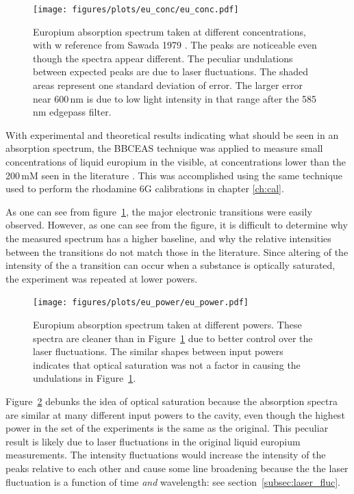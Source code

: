 \begin{figure}[t]
\begin{center}
\texttt{[image: figures/plots/eu\_conc/eu\_conc.pdf]}
\end{center}
\caption[Europium Absorption Spectra at different Concentrations]{Europium absorption spectrum taken at different concentrations, with w reference from Sawada 1979 \cite{Sawada:1979vca}. The peaks are noticeable even though the spectra appear different. The peculiar undulations between expected peaks are due to laser fluctuations. The shaded areas represent one standard deviation of error. The larger error near 600\,nm is due to low light intensity in that range after the 585\,nm edgepass filter.}
\label{fig:eu_conc}
\end{figure}

With experimental and theoretical results indicating what should be seen in
an absorption spectrum, the \ac{BBCEAS} technique was applied to measure
small concentrations of liquid europium in the visible, at concentrations
lower than the 200\,mM seen in the literature \cite{Sawada:1979vca}. This
was accomplished using the same technique used to perform the rhodamine 6G
calibrations in chapter \ref{ch:cal}.

As one can see from figure~\ref{fig:eu_conc}, the major electronic transitions
were easily observed. However, as one can see from the figure, it is difficult
to determine why the measured spectrum has a higher baseline, and why the
relative intensities between the transitions do not match those in the
literature. Since altering of the intensity of the a transition can occur
when a substance is optically saturated, the experiment was repeated at lower
powers.

\begin{figure}[t]
\begin{center}
  \texttt{[image: figures/plots/eu\_power/eu\_power.pdf]}
\end{center}
\caption[Europium Absorption Spectra at different Input Intensities]{Europium absorption spectrum taken at different powers. These spectra are cleaner than in Figure~\ref{fig:eu_conc} due to better control over the laser fluctuations. The similar shapes between input powers indicates that optical saturation was not a factor in causing the undulations in Figure~\ref{fig:eu_conc}.}
\label{fig:eu_power}
\end{figure}

Figure~\ref{fig:eu_power} debunks the idea of optical saturation because the
absorption spectra are similar at many different input powers to the cavity,
even though the highest power in the set of the experiments is the same as
the original. This peculiar result is likely due to laser fluctuations in
the original liquid europium measurements. The intensity fluctuations would
increase the intensity of the peaks relative to each other and cause some line
broadening because the the laser fluctuation is a function of time \emph{and}
wavelength: see section~\ref{subsec:laser_fluc}.

